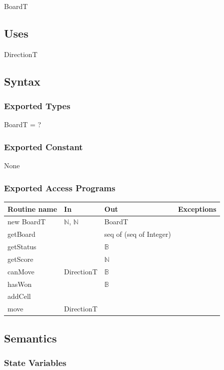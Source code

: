 \documentclass[12pt]{article}
\begin{document}
BoardT

\subsection* {Uses}

DirectionT

\subsection* {Syntax}

\subsubsection* {Exported Types}

BoardT = ?

\subsubsection* {Exported Constant}

None

\subsubsection* {Exported Access Programs}

\begin{tabular}{| l | l | l | l |}
\hline
\textbf{Routine name} & \textbf{In} & \textbf{Out} & \textbf{Exceptions}\\
\hline
new BoardT & $\mathbb{N}$, $\mathbb{N}$ & BoardT & \\
\hline
getBoard & ~ & seq of (seq of Integer) & \\
\hline
getStatus & ~ & $\mathbb{B}$ & \\
\hline
getScore & ~ & $\mathbb{N}$ & \\
\hline
canMove & DirectionT & $\mathbb{B}$ & \\
\hline
hasWon & ~ & $\mathbb{B}$ & \\
\hline
addCell & ~ & ~ &\\
\hline
move  & DirectionT &  ~  & \\
\hline
\end{tabular}

\subsection* {Semantics}

\subsubsection* {State Variables}
\end{document}
